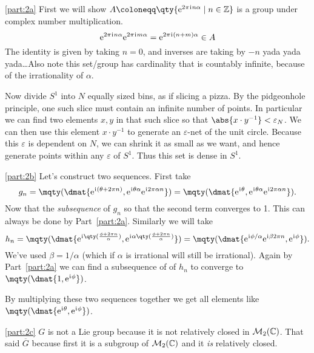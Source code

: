 \documentclass[
	pages,
	boxes,
	color=WildStrawberry
]{homework}
\begin{document}
\begin{solution}
	\ref{part:2a}
	First we will show $A\defeq\qty{\e^{2\pi\iu n\alpha}\mid n\in\Z}$ is a group under complex number multiplication.
	\begin{equation*}
		\mathrm{e}^{2\pi\mkern1mu\mathrm{i}\mkern1mu n\alpha}\mathrm{e}^{2\pi\mkern1mu\mathrm{i}\mkern1mu m\alpha} = \mathrm{e}^{2\pi\mkern1mu\mathrm{i}\mkern1mu(n + m)\alpha}\in A
	\end{equation*}
	The identity is given by taking $n = 0$, and inverses are taking by $-n$ yada yada yada\dots Also note this set/group has cardinality that is countably infinite, because of the irrationality of $\alpha$.

	Now divide $S^1$ into $N$ equally sized bins, as if slicing a pizza. By the pidgeonhole principle, one such slice must contain an infinite number of points. In particular we can find two elements $x, y$ in that such slice so that $\abs{x\cdot y^{-1}}<\varepsilon_N$. We can then use this element $x\cdot y^{-1}$ to generate an $\varepsilon$-net of the unit circle. Because this $\varepsilon$ is dependent on $N$, we can shrink it as small as we want, and hence generate points within any $\varepsilon$ of $S^1$. Thus this set is dense in $S^1$.

	\ref{part:2b}
	Let's construct two sequences. First take
	\begin{equation*}
		g_n = \mqty(\dmat{\e^{\iu(\theta + 2\pi n)}, \e^{\iu\theta\alpha}\e^{\iu 2\pi\alpha n}}) = \mqty(\dmat{\e^{\iu \theta}, \e^{\iu\theta\alpha}\e^{\iu 2\pi\alpha n}}).
	\end{equation*}
	Now that the \emph{subsequence} of $g_n$ so that the second term converges to 1. This can always be done by Part~\ref{part:2a}. Similarly we will take
	\begin{equation*}
		h_n = \mqty(\dmat{\e^{\iu\qty(\frac{\phi + 2\pi n}{\alpha})}, \e^{\iu\alpha\qty(\frac{\phi + 2\pi n}{\alpha})}}) = \mqty(\dmat{\e^{\iu\phi/\alpha}\e^{\iu\beta 2\pi n}, \e^{\iu \phi}}).
	\end{equation*}
	We've used $\beta = 1/\alpha$ (which if $\alpha$ is irrational will still be irrational). Again by Part~\ref{part:2a} we can find a subsequence of of $h_n$ to converge to $\mqty(\dmat{1, \e^{\iu\phi}})$.

	By multiplying these two sequences together we get all elements like $\mqty(\dmat{\e^{\iu\theta}, \e^{\iu\phi}})$.

	\ref{part:2c}
	$G$ is not a Lie group because it is not relatively closed in $\mathcal{M}_{2}(\mathbb{C})$. That said $\overline{G}$ because first it is a subgroup of $\mathcal{M}_{2}(\mathbb{C})$ and it \emph{is} relatively closed.
\end{solution}
\end{document}

